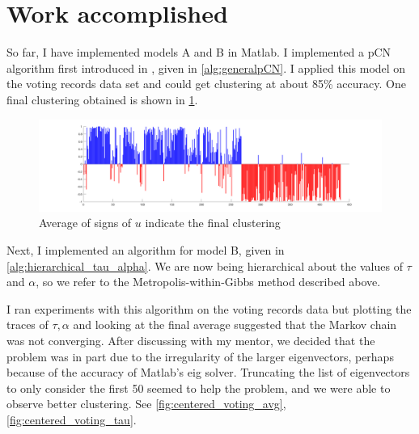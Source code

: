 \documentclass{siamart1116}
\begin{document}
\section{Work accomplished}
So far, I have implemented models A and B in Matlab. I implemented a pCN algorithm first introduced in \cite{BeRoStVo08}, given in \cref{alg:generalpCN}.
I applied this model on the voting records data set and could get clustering at about 85\% accuracy. One final clustering obtained is shown in \cref{fig:mcmc_gamma_final}.
\begin{figure}[!htb]
\label{fig:mcmc_gamma_final}
\caption{Average of signs of $u$ indicate the final clustering}
\includegraphics[width = \linewidth]{mcmc_gamma/manycorrect_clustering.png}
\end{figure}

Next, I implemented an algorithm for model B, given in \cref{alg:hierarchical_tau_alpha}. We are now being hierarchical about the values of $\tau$ and $\alpha$, so we refer to the Metropolis-within-Gibbs method described above.

I ran experiments with this algorithm on the voting records data but plotting the traces of $\tau, \alpha$ and looking at the final average suggested that the Markov chain was not converging. After discussing with my mentor, we decided that the problem was in part due to the irregularity of the larger eigenvectors, perhaps because of the accuracy of Matlab's eig solver. Truncating the list of eigenvectors to only consider the first 50 seemed to help the problem, and we were able to observe better clustering. See \cref{fig:centered_voting_avg}, \cref{fig:centered_voting_tau}.
\end{document}
